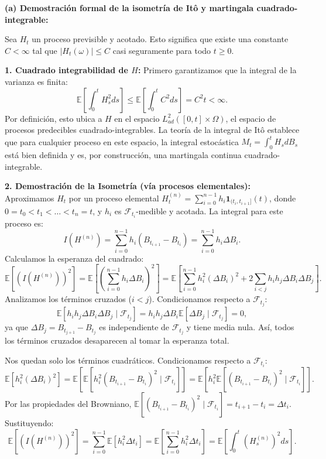 \documentclass[11pt, letterpaper]{article}
\begin{document}
\begin{solucion}
    \vspace{3mm}
    \textbf{(a) Demostración formal de la isometría de Itô y martingala cuadrado-integrable:}

    Sea $H_t$ un proceso previsible y acotado. Esto significa que existe una constante $C < \infty$ tal que $|H_t(\omega)| \le C$ casi seguramente para todo $t \ge 0$.

    \textbf{1. Cuadrado integrabilidad de $H$:}
    Primero garantizamos que la integral de la varianza es finita:
    \[ \mathbb{E}\left[ \int_0^t H_s^2 ds \right] \le \mathbb{E}\left[ \int_0^t C^2 ds \right] = C^2 t < \infty. \]
    Por definición, esto ubica a $H$ en el espacio $L^2_{ad}([0, t] \times \Omega)$, el espacio de procesos predecibles cuadrado-integrables. La teoría de la integral de Itô establece que para cualquier proceso en este espacio, la integral estocástica $M_t = \int_0^t H_s dB_s$ está bien definida y es, por construcción, una martingala continua cuadrado-integrable.

    \textbf{2. Demostración de la Isometría (vía procesos elementales):}
    Aproximamos $H_t$ por un proceso elemental $H_t^{(n)} = \sum_{i=0}^{n-1} h_i \mathbf{1}_{(t_i, t_{i+1}]}(t)$, donde $0 = t_0 < t_1 < \dots < t_n = t$, y $h_i$ es $\mathcal{F}_{t_i}$-medible y acotada.
    La integral para este proceso es:
    \[ I(H^{(n)}) = \sum_{i=0}^{n-1} h_i (B_{t_{i+1}} - B_{t_i}) = \sum_{i=0}^{n-1} h_i \Delta B_i. \]
    Calculamos la esperanza del cuadrado:
    \[ \mathbb{E}\left[ (I(H^{(n)}))^2 \right] = \mathbb{E}\left[ \left( \sum_{i=0}^{n-1} h_i \Delta B_i \right)^2 \right] = \mathbb{E}\left[ \sum_{i=0}^{n-1} h_i^2 (\Delta B_i)^2 + 2 \sum_{i < j} h_i h_j \Delta B_i \Delta B_j \right]. \]
    Analizamos los términos cruzados ($i < j$). Condicionamos respecto a $\mathcal{F}_{t_j}$:
    \[ \mathbb{E}[h_i h_j \Delta B_i \Delta B_j \mid \mathcal{F}_{t_j}] = h_i h_j \Delta B_i \mathbb{E}[\Delta B_j \mid \mathcal{F}_{t_j}] = 0, \]
    ya que $\Delta B_j = B_{t_{j+1}} - B_{t_j}$ es independiente de $\mathcal{F}_{t_j}$ y tiene media nula. Así, todos los términos cruzados desaparecen al tomar la esperanza total.
    
    Nos quedan solo los términos cuadráticos. Condicionamos respecto a $\mathcal{F}_{t_i}$:
    \[ \mathbb{E}[h_i^2 (\Delta B_i)^2] = \mathbb{E}\left[ \mathbb{E}[h_i^2 (B_{t_{i+1}} - B_{t_i})^2 \mid \mathcal{F}_{t_i}] \right] = \mathbb{E}\left[ h_i^2 \mathbb{E}[(B_{t_{i+1}} - B_{t_i})^2 \mid \mathcal{F}_{t_i}] \right]. \]
    Por las propiedades del Browniano, $\mathbb{E}[(B_{t_{i+1}} - B_{t_i})^2 \mid \mathcal{F}_{t_i}] = t_{i+1} - t_i = \Delta t_i$.
    Sustituyendo:
    \[ \mathbb{E}\left[ (I(H^{(n)}))^2 \right] = \sum_{i=0}^{n-1} \mathbb{E}[h_i^2 \Delta t_i] = \mathbb{E}\left[ \sum_{i=0}^{n-1} h_i^2 \Delta t_i \right] = \mathbb{E}\left[ \int_0^t (H_s^{(n)})^2 ds \right]. \]
    

\end{solucion}
\end{document}
